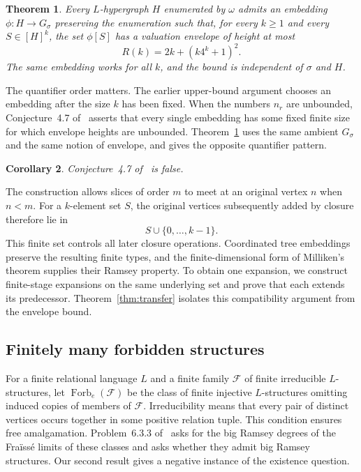 \documentclass{article}
\numberwithin{equation}{section}
\newtheorem{theorem}{Theorem}[section]
\newtheorem{corollary}[theorem]{Corollary}
\theoremstyle{definition}
\newcommand{\N}{\omega}
\begin{document}
\begin{theorem}\label{thm:envelopes}
Every $L$-hypergraph $H$ enumerated by $\N$ admits an embedding
$\phi:H\to G_\sigma$ preserving the enumeration such that, for every
$k\geq1$ and every $S\in[H]^k$, the set $\phi[S]$ has a valuation
envelope of height at most
\begin{equation}\label{eq:R}
R(k)=2k+(k4^k+1)^2.
\end{equation}
The same embedding works for all $k$, and the bound is independent of
$\sigma$ and $H$.
\end{theorem}

The quantifier order matters. The earlier upper-bound argument chooses
an embedding after the size $k$ has been fixed. When the numbers $n_r$
are unbounded, Conjecture~4.7 of~\cite{InfiniteLanguages} asserts that
every single embedding has some fixed finite size for which envelope
heights are unbounded. Theorem~\ref{thm:envelopes} uses the same ambient
$G_\sigma$ and the same notion of envelope, and gives the opposite
quantifier pattern.

\begin{corollary}\label{cor:counterexample}
Conjecture~4.7 of~\cite{InfiniteLanguages} is false.
\end{corollary}

The construction allows slices of order $m$ to meet at an original
vertex $n$ when $n<m$. For a $k$-element set $S$, the original vertices
subsequently added by closure therefore lie in
\[
S\cup\{0,\ldots,k-1\}.
\]
This finite set controls all later closure operations. Coordinated tree
embeddings preserve the resulting finite types, and the
finite-dimensional form of Milliken's theorem supplies their Ramsey
property. To obtain one expansion, we construct finite-stage expansions
on the same underlying set and prove that each extends its predecessor.
Theorem~\ref{thm:transfer} isolates this compatibility argument from the
envelope bound.

\subsection{Finitely many forbidden structures}

For a finite relational language $L$ and a finite family $\mathcal F$ of
finite irreducible $L$-structures, let $\operatorname{Forb}_e(\mathcal F)$
be the class of finite injective $L$-structures omitting induced copies
of members of $\mathcal F$. Irreducibility means that every pair of
distinct vertices occurs together in some positive relation tuple.
This condition ensures free amalgamation. Problem~6.3.3
of~\cite[p.~2145]{BinaryExact} asks for the big Ramsey degrees of the
Fra\"iss\'e limits of these classes and asks whether they admit big
Ramsey structures. Our second result gives a negative instance of the
existence question.
\end{document}

